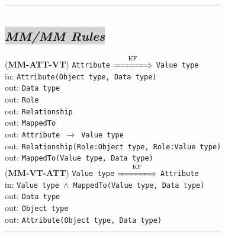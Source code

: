 \documentclass[sn-mathphys]{sn-jnl}
\begin{document}
{{{{------------------------------------------------------------------------------


\subsection{\colorbox{lightgray}{\em MM/MM Rules}}


({\bf MM-ATT-VT}) {\tt Attribute} $\overset{\text{KF}}{\xLongrightarrow{\hspace*{1.4cm}}}$ {\tt Value type}\\
\hspace*{0.3cm}in: {\tt Attribute(Object type, Data type)} \\
\hspace*{0.5cm}out:  {\tt Data type}\\
\hspace*{0.5cm}out:  {\tt Role}\\
\hspace*{0.5cm}out:  {\tt Relationship}\\
\hspace*{0.5cm}out:  {\tt MappedTo}\\
\hspace*{0.5cm}out:  {\tt Attribute $\rightarrow$ Value type}\\
\hspace*{0.5cm}out:  {\tt Relationship(Role:Object type, Role:Value type)}\\
\hspace*{0.5cm}out:  {\tt MappedTo(Value type, Data type)}\\


({\bf MM-VT-ATT}) {\tt Value type} $\overset{\text{KF}}{\xLongrightarrow{\hspace*{1.4cm}}}$ {\tt Attribute}\\
\hspace*{0.3cm}in: {\tt Value type $\wedge$ MappedTo(Value type, Data type)} \\
\hspace*{0.5cm}out: {\tt Data type}\\
\hspace*{0.5cm}out: {\tt Object type}\\
\hspace*{0.5cm}out: {\tt Attribute(Object type, Data type)}\\

------------------------------------------------------------------------------

}}}}
\end{document}
